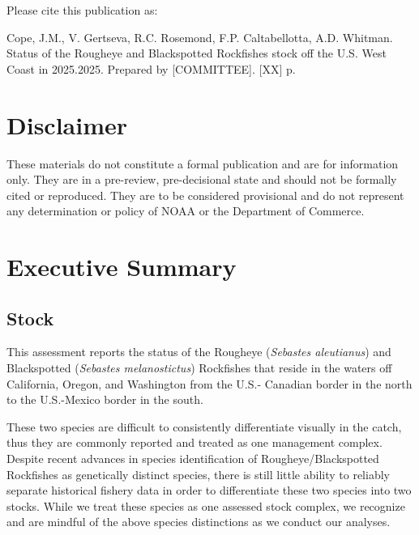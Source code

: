 \documentclass[
]{scrartcl}
\renewcommand*\contentsname{Table of contents}
\newcommand\contentsname{Table of contents}
\begin{document}
\renewcommand*\contentsname{Table of contents}
{
\hypersetup{linkcolor=}
\setcounter{tocdepth}{3}
\tableofcontents
}

\newpage{}

Please cite this publication as:

Cope, J.M., V. Gertseva, R.C. Rosemond, F.P. Caltabellotta, A.D.
Whitman. Status of the Rougheye and Blackspotted Rockfishes stock off
the U.S. West Coast in 2025.2025. Prepared by {[}COMMITTEE{]}. {[}XX{]}
p.

\newpage{}

\section*{Disclaimer}\label{disclaimer}

These materials do not constitute a formal publication and are for
information only. They are in a pre-review, pre-decisional state and
should not be formally cited or reproduced. They are to be considered
provisional and do not represent any determination or policy of NOAA or
the Department of Commerce.

\newpage{}

\section{Executive Summary}\label{executive-summary}

\subsection{Stock}\label{stock}

This assessment reports the status of the Rougheye (\emph{Sebastes
aleutianus}) and Blackspotted (\emph{Sebastes melanostictus}) Rockfishes
that reside in the waters off California, Oregon, and Washington from
the U.S.- Canadian border in the north to the U.S.-Mexico border in the
south.

These two species are difficult to consistently differentiate visually
in the catch, thus they are commonly reported and treated as one
management complex. Despite recent advances in species identification of
Rougheye/Blackspotted Rockfishes as genetically distinct species, there
is still little ability to reliably separate historical fishery data in
order to differentiate these two species into two stocks. While we treat
these species as one assessed stock complex, we recognize and are
mindful of the above species distinctions as we conduct our analyses.
\end{document}

